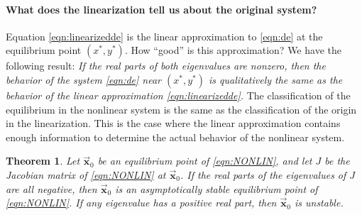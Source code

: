 \documentclass[reqno]{immbook}
\newcommand{\BX}{\vec{\textbf{x}}}
\newtheorem{theorem}{Theorem}
\begin{document}
\paragraph{What does the linearization tell us about the original system?}
Equation \eqref{eqn:linearizedde}
is the linear approximation to \eqref{eqn:de} at the
equilibrium point $(x^*,y^*)$.
How ``good'' is this approximation?
We have the following result:
\emph{If the real parts of both eigenvalues
are nonzero, then the behavior of the system \eqref{eqn:de}
near $(x^*,y^*)$ is qualitatively the same as the behavior of the
linear approximation \eqref{eqn:linearizedde}.}
The classification of the equilibrium in the nonlinear system
is the same as the classification of the origin in
the linearization.
This is the case where the linear approximation contains
enough information to determine the actual behavior of the
nonlinear system.

\begin{theorem}
Let $\BX_0$ be an equilibrium point of
\eqref{eqn:NONLIN}, and let $J$ be the Jacobian
matrix of \eqref{eqn:NONLIN} at $\BX_0$.
If the real parts of the eigenvalues of $J$
are all negative, then $\BX_0$ is an
asymptotically stable equilibrium point
of \eqref{eqn:NONLIN}.
If any eigenvalue has a positive real part,
then $\BX_0$ is unstable.
\end{theorem}
\end{document}
